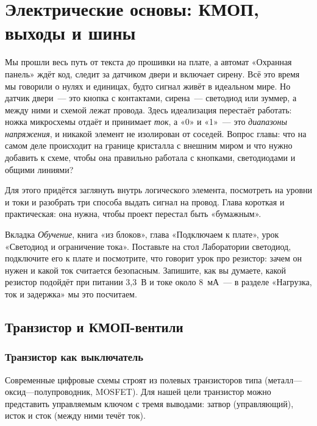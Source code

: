 \chapter{Электрические основы: КМОП, выходы и шины}
\label{ch:electrical}

Мы прошли весь путь от текста до прошивки на плате, а автомат «Охранная
панель» ждёт код, следит за датчиком двери и включает сирену. Всё это время мы говорили о нулях и единицах, будто
сигнал живёт в идеальном мире. Но датчик двери~--- это кнопка с контактами,
сирена~--- светодиод или зуммер, а между ними и схемой лежат провода. Здесь
идеализация перестаёт работать: ножка микросхемы отдаёт и принимает
\emph{ток}, а «0» и «1»~--- это \emph{диапазоны напряжения}, и никакой
элемент не изолирован от соседей. Вопрос главы: что на самом деле происходит
на границе кристалла с внешним миром и что нужно добавить к схеме, чтобы она
правильно работала с кнопками, светодиодами и общими линиями?

Для этого придётся заглянуть внутрь логического элемента, посмотреть на
уровни и токи и разобрать три способа выдать сигнал на провод. Глава короткая
и практическая: она нужна, чтобы проект перестал быть «бумажным».

\begin{buildbox}
Вкладка \emph{Обучение}, книга «из блоков», глава «Подключаем к плате», урок
«Светодиод и ограничение тока». Поставьте на стол Лаборатории светодиод,
подключите его к плате и посмотрите, что говорит урок про резистор: зачем
он нужен и какой ток считается безопасным. Запишите, как вы думаете, какой
резистор подойдёт при питании 3,3~В и токе около 8~мА~--- в разделе
«Нагрузка, ток и задержка» мы это посчитаем.
\end{buildbox}

\section{Транзистор и КМОП-вентили}

\subsection{Транзистор как выключатель}

Современные цифровые схемы строят из полевых транзисторов типа 
(металл---оксид---полупроводник, MOSFET). Для нашей цели транзистор можно
представить управляемым ключом с тремя выводами: затвор (управляющий),
исток и сток (между ними течёт ток).


